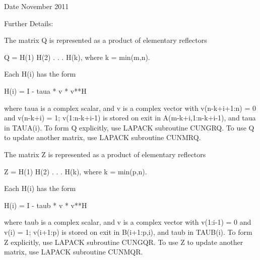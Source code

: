 \begin{DoxyDate}{Date}
November 2011 
\end{DoxyDate}
\begin{DoxyParagraph}{Further Details\+: }
\begin{DoxyVerb}  The matrix Q is represented as a product of elementary reflectors

     Q = H(1) H(2) . . . H(k), where k = min(m,n).

  Each H(i) has the form

     H(i) = I - taua * v * v**H

  where taua is a complex scalar, and v is a complex vector with
  v(n-k+i+1:n) = 0 and v(n-k+i) = 1; v(1:n-k+i-1) is stored on exit in
  A(m-k+i,1:n-k+i-1), and taua in TAUA(i).
  To form Q explicitly, use LAPACK subroutine CUNGRQ.
  To use Q to update another matrix, use LAPACK subroutine CUNMRQ.

  The matrix Z is represented as a product of elementary reflectors

     Z = H(1) H(2) . . . H(k), where k = min(p,n).

  Each H(i) has the form

     H(i) = I - taub * v * v**H

  where taub is a complex scalar, and v is a complex vector with
  v(1:i-1) = 0 and v(i) = 1; v(i+1:p) is stored on exit in B(i+1:p,i),
  and taub in TAUB(i).
  To form Z explicitly, use LAPACK subroutine CUNGQR.
  To use Z to update another matrix, use LAPACK subroutine CUNMQR.\end{DoxyVerb}
 
\end{DoxyParagraph}
